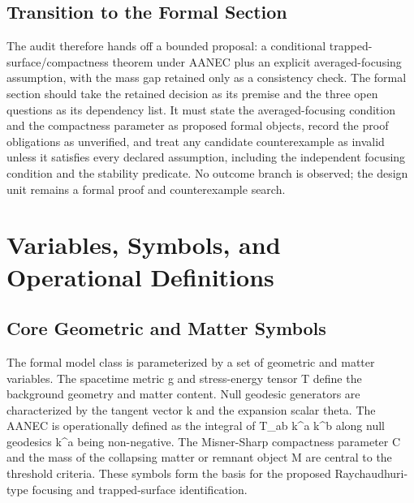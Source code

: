\documentclass[conference]{IEEEtran}
\begin{document}
\subsection{Transition to the Formal Section}
The audit therefore hands off a bounded proposal: a conditional trapped-surface/compactness theorem under AANEC plus an explicit averaged-focusing assumption, with the mass gap retained only as a consistency check. The formal section should take the retained decision as its premise and the three open questions as its dependency list. It must state the averaged-focusing condition and the compactness parameter as proposed formal objects, record the proof obligations as unverified, and treat any candidate counterexample as invalid unless it satisfies every declared assumption, including the independent focusing condition and the stability predicate. No outcome branch is observed; the design unit remains a formal proof and counterexample search.

\section{Variables, Symbols, and Operational Definitions}
\subsection{Core Geometric and Matter Symbols}
The formal model class is parameterized by a set of geometric and matter variables. The spacetime metric g and stress-energy tensor T define the background geometry and matter content. Null geodesic generators are characterized by the tangent vector k and the expansion scalar theta. The AANEC is operationally defined as the integral of T\_ab k\textasciicircum{}a k\textasciicircum{}b along null geodesics k\textasciicircum{}a being non-negative. The Misner-Sharp compactness parameter C and the mass of the collapsing matter or remnant object M are central to the threshold criteria. These symbols form the basis for the proposed Raychaudhuri-type focusing and trapped-surface identification.~\cite{cite_0ed84243cf171bc4}
\end{document}
